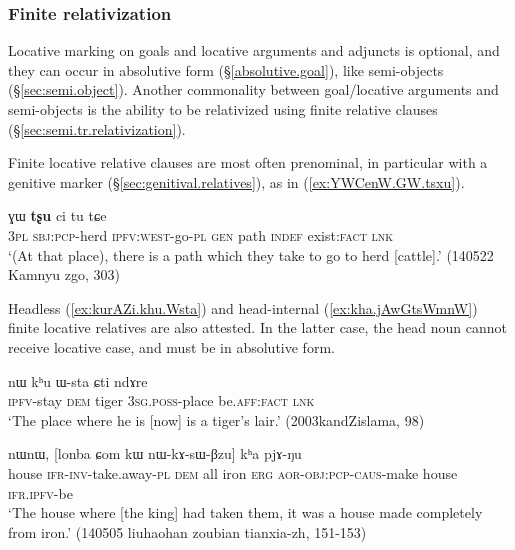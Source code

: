 \subsubsection{Finite relativization}  \label{sec:locative.relativization.finite}
Locative marking on goals and locative arguments and adjuncts is optional, and they can occur in absolutive form (§\ref{absolutive.goal}), like semi-objects (§\ref{sec:semi.object}). Another commonality between goal/locative arguments and semi-objects is the ability to be relativized using finite relative clauses (§\ref{sec:semi.tr.relativization}). 

Finite locative relative clauses are most often prenominal, in particular with a genitive marker (§\ref{sec:genitival.relatives}), as in (\ref{ex:YWCenW.GW.tsxu}).

\begin{exe}
\ex \label{ex:YWCenW.GW.tsxu}
 ɣɯ \textbf{tʂu} ci tu tɕe  \\
\textsc{3pl} \textsc{sbj}:\textsc{pcp}-herd \textsc{ipfv}:\textsc{west}-go-\textsc{pl} \textsc{gen} path \textsc{indef} exist:\textsc{fact} \textsc{lnk} \\
\glt `(At that place), there is a path which they take to go to herd [cattle].' (140522 Kamnyu zgo, 303)
\end{exe} 

Headless (\ref{ex:kurAZi.khu.Wsta}) and head-internal (\ref{ex:kha.jAwGtsWmnW}) finite locative relatives are also attested. In the latter case, the head noun cannot receive locative case, and must be in absolutive form.

\begin{exe}
\ex \label{ex:kurAZi.khu.Wsta}
\gll [ku-rɤʑi] nɯ kʰu ɯ-sta ɕti ndɤre \\
\textsc{ipfv}-stay \textsc{dem} tiger \textsc{3sg}.\textsc{poss}-place be.\textsc{aff}:\textsc{fact} \textsc{lnk} \\
\glt `The place where he is [now] is a tiger's lair.' (2003kandZislama, 98)
\end{exe} 

\begin{exe}
\ex \label{ex:kha.jAwGtsWmnW}
 nɯnɯ,  [lonba ɕom kɯ nɯ-kɤ-sɯ-βzu] kʰa pjɤ-ŋu \\
house \textsc{ifr}-\textsc{inv}-take.away-\textsc{pl} \textsc{dem} all iron \textsc{erg} \textsc{aor}-\textsc{obj}:\textsc{pcp}-\textsc{caus}-make house \textsc{ifr}.\textsc{ipfv}-be \\
\glt `The house where [the king] had taken them, it was a house made completely from iron.' (140505 liuhaohan zoubian tianxia-zh, 151-153)
\end{exe}


